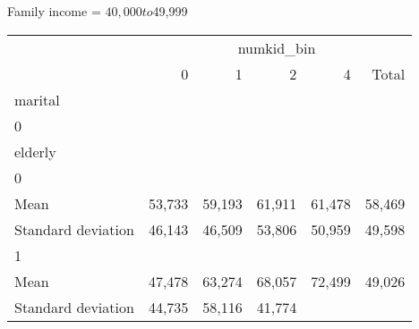 Family income = $40,000 to $49,999
\begin{tabular}{llllll}
\cline{1-6}
\multicolumn{1}{c}{} &
  \multicolumn{5}{|c}{numkid\_bin} \\
\multicolumn{1}{c}{} &
  \multicolumn{1}{|r}{0} &
  \multicolumn{1}{r}{1} &
  \multicolumn{1}{r}{2} &
  \multicolumn{1}{r}{4} &
  \multicolumn{1}{r}{Total} \\
\cline{1-6}
\multicolumn{1}{l}{marital} &
  \multicolumn{1}{|r}{} &
  \multicolumn{1}{r}{} &
  \multicolumn{1}{r}{} &
  \multicolumn{1}{r}{} &
  \multicolumn{1}{r}{} \\
\multicolumn{1}{l}{\hspace{1em}0} &
  \multicolumn{1}{|r}{} &
  \multicolumn{1}{r}{} &
  \multicolumn{1}{r}{} &
  \multicolumn{1}{r}{} &
  \multicolumn{1}{r}{} \\
\multicolumn{1}{l}{\hspace{2em}elderly} &
  \multicolumn{1}{|r}{} &
  \multicolumn{1}{r}{} &
  \multicolumn{1}{r}{} &
  \multicolumn{1}{r}{} &
  \multicolumn{1}{r}{} \\
\multicolumn{1}{l}{\hspace{3em}0} &
  \multicolumn{1}{|r}{} &
  \multicolumn{1}{r}{} &
  \multicolumn{1}{r}{} &
  \multicolumn{1}{r}{} &
  \multicolumn{1}{r}{} \\
\multicolumn{1}{l}{\hspace{4em}Mean} &
  \multicolumn{1}{|r}{53,733} &
  \multicolumn{1}{r}{59,193} &
  \multicolumn{1}{r}{61,911} &
  \multicolumn{1}{r}{61,478} &
  \multicolumn{1}{r}{58,469} \\
\multicolumn{1}{l}{\hspace{4em}Standard deviation} &
  \multicolumn{1}{|r}{46,143} &
  \multicolumn{1}{r}{46,509} &
  \multicolumn{1}{r}{53,806} &
  \multicolumn{1}{r}{50,959} &
  \multicolumn{1}{r}{49,598} \\
\multicolumn{1}{l}{\hspace{3em}1} &
  \multicolumn{1}{|r}{} &
  \multicolumn{1}{r}{} &
  \multicolumn{1}{r}{} &
  \multicolumn{1}{r}{} &
  \multicolumn{1}{r}{} \\
\multicolumn{1}{l}{\hspace{4em}Mean} &
  \multicolumn{1}{|r}{47,478} &
  \multicolumn{1}{r}{63,274} &
  \multicolumn{1}{r}{68,057} &
  \multicolumn{1}{r}{72,499} &
  \multicolumn{1}{r}{49,026} \\
\multicolumn{1}{l}{\hspace{4em}Standard deviation} &
  \multicolumn{1}{|r}{44,735} &
  \multicolumn{1}{r}{58,116} &
  \multicolumn{1}{r}{41,774} &

\end{tabular}

